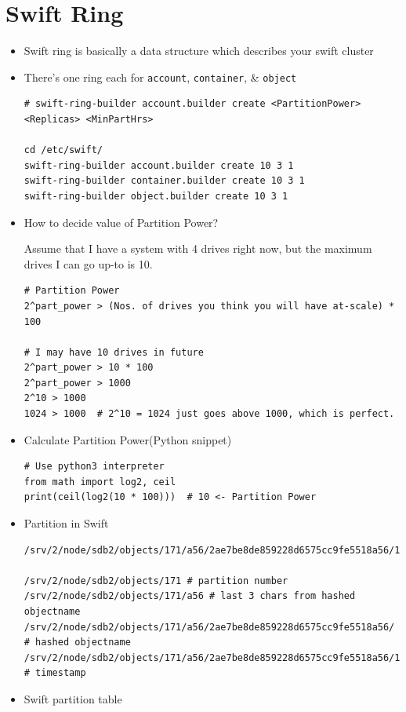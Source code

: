 \documentclass{article}
\begin{document}
\section{Swift Ring}
\label{sec:org3782ecb}
\begin{itemize}
\item Swift ring is basically a data structure which describes your
swift cluster
\item There's one ring each for \texttt{account}, \texttt{container}, \& \texttt{object}
\begin{verbatim}
# swift-ring-builder account.builder create <PartitionPower> <Replicas> <MinPartHrs>

cd /etc/swift/
swift-ring-builder account.builder create 10 3 1
swift-ring-builder container.builder create 10 3 1
swift-ring-builder object.builder create 10 3 1
\end{verbatim}

\item How to decide value of Partition Power?

Assume that I have a system with 4 drives right now, but the
maximum drives I can go up-to is 10.
\begin{verbatim}
# Partition Power
2^part_power > (Nos. of drives you think you will have at-scale) * 100

# I may have 10 drives in future
2^part_power > 10 * 100
2^part_power > 1000
2^10 > 1000
1024 > 1000  # 2^10 = 1024 just goes above 1000, which is perfect.
\end{verbatim}

\item Calculate Partition Power(Python snippet)
\begin{verbatim}
# Use python3 interpreter
from math import log2, ceil
print(ceil(log2(10 * 100)))  # 10 <- Partition Power
\end{verbatim}

\item Partition in Swift

\begin{verbatim}
/srv/2/node/sdb2/objects/171/a56/2ae7be8de859228d6575cc9fe5518a56/1479968148.23926.data

/srv/2/node/sdb2/objects/171 # partition number
/srv/2/node/sdb2/objects/171/a56 # last 3 chars from hashed objectname
/srv/2/node/sdb2/objects/171/a56/2ae7be8de859228d6575cc9fe5518a56/ # hashed objectname
/srv/2/node/sdb2/objects/171/a56/2ae7be8de859228d6575cc9fe5518a56/1479968148 # timestamp
\end{verbatim}

\item Swift partition table
\end{itemize}
\end{document}
